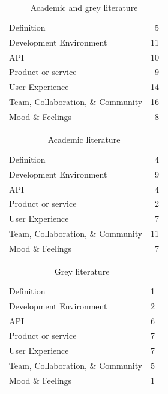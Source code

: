 \documentclass[english, 12pt, a4paper, sci, utf8, a-1b, online]{aaltothesis}
\begin{document}
\begin{table}[H]
  \begin{center}
    \begin{tabular}{l r}
      Definition                        & 5  \\
      Development Environment           & 11 \\
      API                               & 10 \\
      Product or service                & 9  \\
      User Experience                   & 14 \\
      Team, Collaboration, \& Community & 16 \\
      Mood \& Feelings                  & 8  \\
    \end{tabular}
    \caption{Academic and grey literature}
  \end{center}
\end{table}

\begin{table}[H]
  \begin{center}
    \begin{tabular}{l r}
      Definition                        & 4  \\
      Development Environment           & 9  \\
      API                               & 4  \\
      Product or service                & 2  \\
      User Experience                   & 7  \\
      Team, Collaboration, \& Community & 11 \\
      Mood \& Feelings                  & 7  \\
    \end{tabular}
    \caption{Academic literature}
  \end{center}
\end{table}

\begin{table}[H]
  \begin{center}
    \begin{tabular}{l r}
      Definition                        & 1 \\
      Development Environment           & 2 \\
      API                               & 6 \\
      Product or service                & 7 \\
      User Experience                   & 7 \\
      Team, Collaboration, \& Community & 5 \\
      Mood \& Feelings                  & 1 \\
    \end{tabular}
    \caption{Grey literature}
  \end{center}
\end{table}
\end{document}
